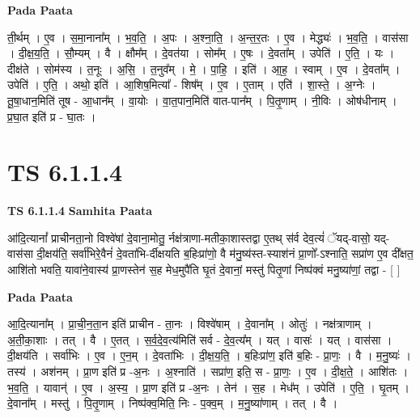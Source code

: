 \documentclass[17pt]{extarticle}
\begin{document}
\textbf{Pada Paata} \newline

ती॒र्थम् । ए॒व । स॒मा॒नाना᳚म् । भ॒व॒ति॒ । अ॒पः । अ॒श्ना॒ति॒ । अ॒न्त॒र॒तः । ए॒व । मेद्ध्यः॑ । भ॒व॒ति॒ । वास॑सा । दी॒क्ष॒य॒ति॒ । सौ॒म्यम् । वै । क्षौम᳚म् । दे॒वत॑या । सोम᳚म् । ए॒षः । दे॒वता᳚म् । उपेति॑ । ए॒ति॒ । यः । दीक्ष॑ते । सोम॑स्य । त॒नूः । अ॒सि॒ । त॒नुव᳚म् । मे॒ । पा॒हि॒ । इति॑ । आ॒ह॒ । स्वाम् । ए॒व । दे॒वता᳚म् । उपेति॑ । ए॒ति॒ । अथो॒ इति॑ । आ॒शिष॒मित्या᳚ - शिष᳚म् । ए॒व । ए॒ताम् । एति॑ । शा॒स्ते॒ । अ॒ग्नेः । तू॒षा॒धान॒मिति॑ तूष - आ॒धान᳚म् । वा॒योः । वा॒त॒पान॒मिति॑ वात-पान᳚म् । पि॒तृ॒णाम् । नी॒विः । ओष॑धीनाम् । प्र॒घा॒त इति॑ प्र - घा॒तः ।  \newline




\section*{ TS 6.1.1.4 }

\textbf{TS 6.1.1.4 } \newline
\textbf{Samhita Paata} \newline

आ॑दि॒त्यानां᳚ प्राचीनता॒नो विश्वे॑षां दे॒वाना॒मोतु॒ र्नक्ष॑त्राणा-मतीका॒शास्तद्वा ए॒तथ् स॑र्व देव॒त्यं॑ ॅयद्-वासो॒ यद्-वास॑सा दी॒क्षय॑ति॒ सर्वा॑भिरे॒वैनं॑ दे॒वता॑भि-र्दीक्षयति ब॒हिःप्रा॑णो॒ वै म॑नु॒ष्य॑स्त-स्याश॑नं प्रा॒णो᳚-ऽश्नाति॒ सप्रा॑ण ए॒व दी᳚क्षत॒ आशि॑तो भवति॒ यावा॑ने॒वास्य॑ प्रा॒णस्तेन॑ स॒ह मेध॒मुपै॑ति घृ॒तं दे॒वानां॒ मस्तु॑ पितृ॒णां निष्प॑क्वं मनु॒ष्या॑णां॒ तद्वा - [  ] \newline

\textbf{Pada Paata} \newline

आ॒दि॒त्याना᳚म् । प्रा॒ची॒न॒ता॒न इति॑ प्राचीन - ता॒नः । विश्वे॑षाम् । दे॒वाना᳚म् । ओतुः॑ । नक्ष॑त्राणाम् । अ॒ती॒का॒शाः । तत् । वै । ए॒तत् । स॒र्व॒दे॒व॒त्य॑मिति॑ सर्व - दे॒व॒त्य᳚म् । यत् । वासः॑ । यत् । वास॑सा । दी॒क्षय॑ति । सर्वा॑भिः । ए॒व । ए॒न॒म् । दे॒वता॑भिः । दी॒क्ष॒य॒ति॒ । ब॒हिःप्रा॑ण॒ इति॑ ब॒हिः - प्रा॒णः॒ । वै । म॒नु॒ष्यः॑ । तस्य॑ । अश॑नम् । प्रा॒ण इति॑ प्र -अ॒नः । अ॒श्नाति॑ । सप्रा॑ण॒ इति॒ स - प्रा॒णः॒ । ए॒व । दी॒क्ष॒ते॒ । आशि॑तः । भ॒व॒ति॒ । यावान्॑ । ए॒व । अ॒स्य॒ । प्रा॒ण इति॑ प्र -अ॒नः । तेन॑ । स॒ह । मेध᳚म् । उपेति॑ । ए॒ति॒ । घृ॒तम् । दे॒वाना᳚म् । मस्तु॑ । पि॒तृ॒णाम् । निष्प॑क्व॒मिति॒ निः - प॒क्व॒म् । म॒नु॒ष्या॑णाम् । तत् । वै ।  \newline
\end{document}

